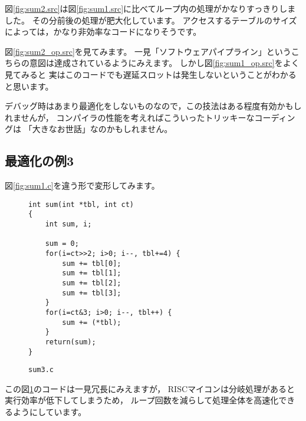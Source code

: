 \documentclass[a4j,10pt,fleqn]{jsarticle}
\begin{document}
図\ref{fig:sum2.src}は図\ref{fig:sum1.src}に比べてループ内の処理がかなりすっきりしました。
その分前後の処理が肥大化しています。
アクセスするテーブルのサイズによっては，かなり非効率なコードになりそうです。

図\ref{fig:sum2_op.src}を見てみます。
一見「ソフトウェアパイプライン」というこちらの意図は達成されているようにみえます。
しかし図\ref{fig:sum1_op.src}をよく見てみると
実はこのコードでも遅延スロットは発生しないということがわかると思います。

デバッグ時はあまり最適化をしないものなので，この技法はある程度有効かもしれませんが，
コンパイラの性能を考えればこういったトリッキーなコーディングは
「大きなお世話」なのかもしれません。


\clearpage
\subsection{最適化の例3}

図\ref{fig:sum1.c}を違う形で変形してみます。
\begin{figure}[tpb]
\begin{boxnote}
{\small\begin{verbatim}
int sum(int *tbl, int ct)
{
    int sum, i;

    sum = 0;
    for(i=ct>>2; i>0; i--, tbl+=4) {
        sum += tbl[0];
        sum += tbl[1];
        sum += tbl[2];
        sum += tbl[3];
    }
    for(i=ct&3; i>0; i--, tbl++) {
        sum += (*tbl);
    }
    return(sum);
}
\end{verbatim}}
\end{boxnote}
\caption{\texttt{sum3.c}} \label{fig:sum3.c}
\end{figure}
この図\ref{fig:sum3.c}のコードは一見冗長にみえますが，
RISCマイコンは分岐処理があると実行効率が低下してしまうため，
ループ回数を減らして処理全体を高速化できるようにしています。
\end{document}
